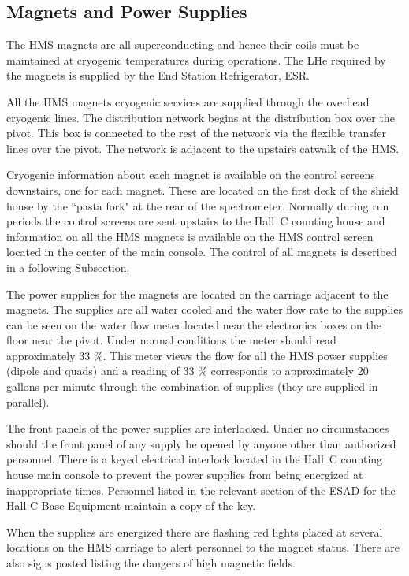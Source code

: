 \subsection{Magnets and Power Supplies}

The HMS magnets are all
superconducting and hence their coils must be maintained at
cryogenic temperatures during operations. The LHe required by the magnets
is supplied by the End Station Refrigerator, ESR.

All the HMS magnets cryogenic services are supplied through the overhead
cryogenic lines. The distribution network begins at the distribution
box over the pivot. This box is connected to the rest of the network via the
flexible transfer lines over the pivot. The network is adjacent to
the upstairs catwalk of the HMS.

Cryogenic information about each magnet is available on the control screens
downstairs, one for each magnet. These are located on the first deck
of the shield house by the ``pasta fork" at the rear of the spectrometer.
Normally during run periods the control screens are sent upstairs to the
Hall~C counting house and information on all the HMS magnets is available
on the HMS control screen located in the center of the main console.
The control of all magnets is described in a following Subsection.

The power supplies for the magnets are located on the carriage
adjacent to the magnets. The supplies are all water cooled and
the water flow rate to the supplies can be seen on the water flow
meter located near the electronics boxes on the floor near the pivot.
Under normal conditions the meter should read
approximately 33 $\%$. This meter views the flow for all the HMS power supplies
(dipole and quads) and a reading of 33 $\%$ corresponds to approximately
20 gallons per minute through the combination of supplies (they are supplied
in parallel).

The front panels of the power supplies are interlocked. Under
no circumstances should the front panel of any supply be opened by anyone other
than authorized personnel. There is a keyed electrical interlock
located in the Hall~C counting house main console to prevent the
power supplies from being energized at inappropriate times.
Personnel listed in the relevant section of the ESAD for the Hall C
Base Equipment maintain a copy
of the key.

When the supplies are energized there are flashing red lights placed at
several locations on the HMS carriage to alert personnel to the magnet
status. There are also signs posted listing the dangers of high magnetic
fields.

